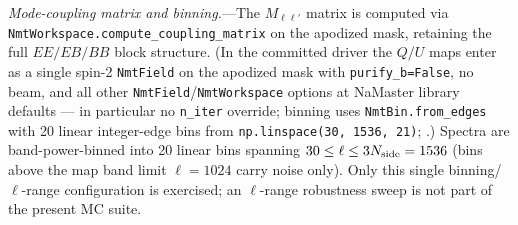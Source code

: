 \documentclass[aps,prd,twocolumn,superscriptaddress,showpacs,preprintnumbers,nofootinbib,longbibliography,floatfix]{revtex4-2}
\begin{document}
\emph{Mode-coupling matrix and binning.}---The $M_{\ell\ell'}$ matrix is
computed via
\texttt{NmtWorkspace.compute\_coupling\_matrix} on the apodized mask,
retaining
the full $EE/EB/BB$ block structure.
(In the committed driver the $Q/U$ maps enter as a single spin-2
\texttt{NmtField} on the apodized mask with \texttt{purify\_b=False}, no
beam, and all other \texttt{NmtField}/\texttt{NmtWorkspace} options at
NaMaster library defaults --- in particular no \texttt{n\_iter} override;
binning uses \texttt{NmtBin.from\_edges} with 20 linear integer-edge bins
from \texttt{np.linspace(30, 1536, 21)};
.) Spectra are band-power-binned into
20 linear bins spanning $30 \le \ell \le 3N_{\rm side}=1536$ (bins above
the map band limit $\ell=1024$ carry noise only). Only this single
binning/$\ell$-range configuration is exercised; an $\ell$-range robustness
sweep is not part of the present MC suite.
\end{document}

